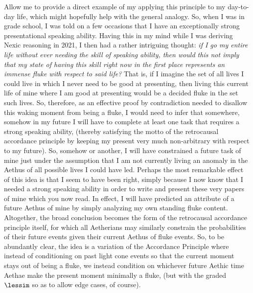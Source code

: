 Allow me to provide a direct example of my applying this principle to my day-to-day life, which might hopefully help with the general analogy. So, when I was in grade school, I was told on a few occasions that I have an exceptionally strong presentational speaking ability. Having this in my mind while I was deriving Nexic reasoning in 2021, I then had a rather intriguing thought: \textit{if I go my entire life without ever needing the skill of speaking ability, then would this not imply that my state of having this skill right now in the first place represents an immense fluke with respect to said life?} That is, if I imagine the set of all lives I could live in which I never need to be good at presenting, then living this current life of mine where I am good at presenting would be a decided fluke in the set such lives. So, therefore, as an effective proof by contradiction needed to disallow this waking moment from being a fluke, I would need to infer that somewhere, somehow in my future I will have to complete at least one task that requires a strong speaking ability, (thereby satisfying the motto of the retrocausal accordance principle by keeping my present very much non-arbitrary with respect to my future). So, somehow or another, I will have constrained a future task of mine just under the assumption that I am not currently living an anomaly in the Aethus of all possible lives I could have led. Perhaps the most remarkable effect of this idea is that I seem to have been right, simply because I now know that I needed a strong speaking ability in order to write and present these very papers of mine which you now read. In effect, I will have predicted an attribute of a future Aethus of mine by simply analyzing my own standing fluke content. Altogether, the broad conclusion becomes the form of the retrocausal accordance principle itself, for which all Aetherians may similarly constrain the probabilities of their future events given their current Aethus of fluke events. So, to be abundantly clear, the idea is a variation of the Accordance Principle where instead of conditioning on past light cone events so that the current moment stays out of being a fluke, we instead condition on whichever future Aethic time Aethae make the present moment minimally a fluke, (but with the graded $\lessim$ so as to allow edge cases, of course).


